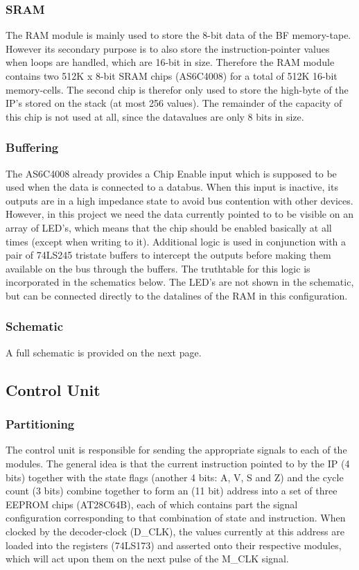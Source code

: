 \subsubsection{SRAM}
The RAM module is mainly used to store the 8-bit data of the BF memory-tape. However its secondary purpose is to also store the instruction-pointer values when loops are handled, which are 16-bit in size. Therefore the RAM module contains two 512K x 8-bit SRAM chips (AS6C4008) for a total of 512K 16-bit memory-cells. The second chip is therefor only used to store the high-byte of the IP's stored on the stack (at most 256 values). The remainder of the capacity of this chip is not used at all, since the datavalues are only 8 bits in size.

\subsubsection{Buffering}
The AS6C4008 already provides a Chip Enable input which is supposed to be used when the data is connected to a databus. When this input is inactive, its outputs are in a high impedance state to avoid bus contention with other devices. However, in this project we need the data currently pointed to to be visible on an array of LED's, which means that the chip should be enabled basically at all times (except when writing to it). Additional logic is used in conjunction with a pair of 74LS245 tristate buffers to intercept the outputs before making them available on the bus through the buffers. The truthtable for this logic is incorporated in the schematics below. The LED's are not shown in the schematic, but can be connected directly to the datalines of the RAM in this configuration. 

\subsubsection{Schematic}
A full schematic is provided on the next page.




\subsection{Control Unit}
\subsubsection{Partitioning}
The control unit is responsible for sending the appropriate signals to each of the modules. The general idea is that the current instruction pointed to by the IP (4 bits) together with the state flags (another 4 bits: A, V, S and Z) and the cycle count (3 bits) combine together to form an (11 bit) address into a set of three EEPROM chips (AT28C64B), each of which contains part the signal configuration corresponding to that combination of state and instruction. When clocked by the decoder-clock (D\_CLK), the values currently at this address are loaded into the registers (74LS173) and asserted onto their respective modules, which will act upon them on the next pulse of the M\_CLK signal.

